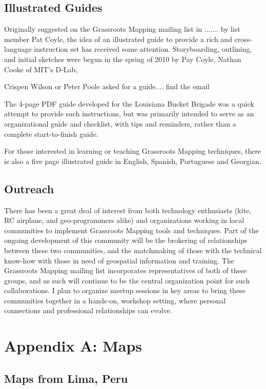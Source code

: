 \documentclass[11pt]{report}
\begin{document}
\section{Illustrated Guides}
\label{sec:guide}

Originally suggested on the Grassroots Mapping mailing list in ....... by list member Pat Coyle, the idea of an illustrated guide to provide a rich and cross-language instruction set has received some attention. Storyboarding, outlining, and initial sketches were begun in the spring of 2010 by Pay Coyle, Nathan Cooke of MIT's D-Lab, 

Crispen Wilson or Peter Poole asked for a guide.... find the email

The 4-page PDF guide developed for the Louisiana Bucket Brigade was a quick attempt to provide such instructions, but was primarily intended to serve as an organizational guide and checklist, with tips and reminders, rather than a complete start-to-finish guide. 

For those interested in learning or teaching Grassroots Mapping techniques, there is also a five page illustrated guide in English, Spanish, Portuguese and Georgian.

\section{Outreach}

There has been a great deal of interest from both technology enthusiasts (kite, RC airplane, and geo-programmers alike) and organizations working in local communities to implement Grassroots Mapping tools and techniques. Part of the ongoing development of this community will be the brokering of relationships between these two communities, and the matchmaking of those with the technical know-how with those in need of geospatial information and training. The Grassroots Mapping mailing list incorporates representatives of both of these groups, and as such will continue to be the central organization point for such collaborations. I plan to organize meetup sessions in key areas to bring these communities together in a hands-on, workshop setting, where personal connections and professional relationships can evolve.


\chapter*{Appendix A: Maps}

\section{Maps from Lima, Peru}
\end{document}
